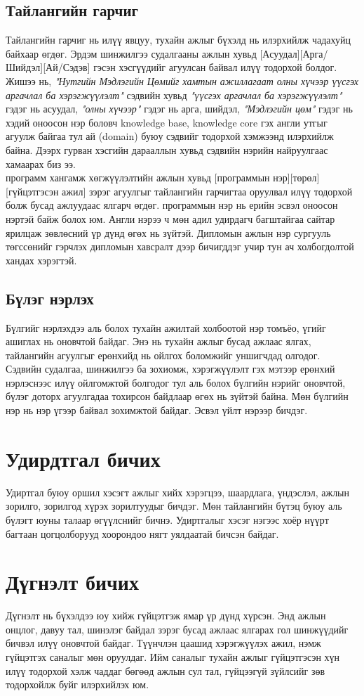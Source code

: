 \subsection{Тайлангийн гарчиг}
Тайлангийн гарчиг нь илүү явцуу, тухайн ажлыг бүхэлд нь илэрхийлж чадахуйц байхаар өгдөг. Эрдэм шинжилгээ судалгааны ажлын хувьд [Асуудал][Арга/Шийдэл][Ай/Сэдэв] гэсэн хэсгүүдийг агуулсан байвал илүү тодорхой болдог. Жишээ нь, \textit{"Нутгийн Мэдлэгийн Цөмийг хамтын ажиллагаат олны хүчээр үүсгэх аргачлал ба хэрэгжүүлэлт"} сэдвийн хувьд \textit{"үүсгэх аргачлал ба хэрэгжүүлэлт"} гэдэг нь асуудал, \textit{"олны хүчээр"} гэдэг нь арга, шийдэл, \textit{"Мэдлэгийн цөм"} гэдэг нь хэдий оноосон нэр боловч knowledge base, knowledge core гэх англи утгыг агуулж байгаа тул ай (domain) буюу сэдвийг тодорхой хэмжээнд илэрхийлж байна. Дээрх гурван хэсгийн дарааллын хувьд сэдвийн нэрийн найруулгаас хамаарах биз ээ.
\\программ хангамж хөгжүүлэлтийн ажлын хувьд [программын нэр][төрөл][гүйцэтгэсэн ажил] зэрэг агуулгыг тайлангийн гарчигтаа оруулвал илүү тодорхой болж бусад ажлуудаас ялгарч өгдөг. программын нэр нь ерийн эсвэл оноосон нэртэй байж болох юм. 
Англи нэрээ ч мөн адил удирдагч багштайгаа сайтар ярилцаж зөвлөсний үр дүнд өгөх нь зүйтэй. Дипломын ажлын нэр сургууль төгссөнийг гэрчлэх дипломын хавсралт дээр бичигддэг учир тун ач холбогдолтой хандах хэрэгтэй.

\subsection{Бүлэг нэрлэх}
Бүлгийг нэрлэхдээ аль болох тухайн ажилтай холбоотой нэр томъёо, үгийг ашиглах нь оновчтой байдаг. Энэ нь тухайн ажлыг бусад ажлаас ялгах, тайлангийн агуулгыг ерөнхийд нь ойлгох боломжийг уншигчдад олгодог. Сэдвийн судалгаа, шинжилгээ ба зохиомж, хэрэгжүүлэлт гэх мэтээр ерөнхий нэрлэснээс илүү ойлгомжтой болгодог тул аль болох бүлгийн нэрийг оновчтой, бүлэг доторх агуулгадаа тохирсон байдлаар өгөх нь зүйтэй байна. Мөн бүлгийн нэр нь нэр үгээр байвал зохимжтой байдаг. Эсвэл үйлт нэрээр бичдэг.

\section{Удирдтгал бичих}
Удиртгал буюу оршил хэсэгт ажлыг хийх хэрэгцээ, шаардлага, үндэслэл, ажлын зорилго, зорилгод хүрэх зорилтуудыг бичдэг. Мөн тайлангийн бүтэц буюу аль бүлэгт юуны талаар өгүүлснийг бичнэ. Удиртгалыг хэсэг нэгээс хоёр нүүрт багтаан цогцолборууд хоорондоо нягт уялдаатай бичсэн байдаг.

\section{Дүгнэлт бичих}
Дүгнэлт нь бүхэлдээ юу хийж гүйцэтгэж ямар үр дүнд хүрсэн. Энд ажлын онцлог, давуу тал, шинэлэг байдал зэрэг бусад ажлаас ялгарах гол шинжүүдийг бичвэл илүү оновчтой байдаг. Түүнчлэн цаашид хэрэгжүүлэх ажил, нэмж гүйцэтгэх саналыг мөн оруулдаг. Ийм саналыг тухайн ажлыг гүйцэтгэсэн хүн илүү тодорхой хэлж чаддаг бөгөөд ажлын сул тал, гүйцээгүй зүйлсийг зөв тодорхойлж буйг илэрхийлэх юм.